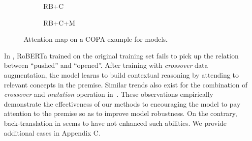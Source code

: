 \begin{figure}[th!]
\begin{subfigure}[b]{0.20\textwidth}
\caption{RB+C}
\label{fig:case_c}
\end{subfigure}
\hfill
\begin{subfigure}[b]{0.20\textwidth}
\centering
{}
\caption{RB+C+M}
\label{fig:case_cm}
\end{subfigure}
\caption{Attention map on a COPA example for models.}
\label{fig:case}
\end{figure}


In , 
RoBERTa trained on the original training set fails to pick up the 
relation between ``pushed'' and ``opened''. 
After training with \textit{crossover} data augmentation, 
the model learns to build contextual reasoning  
by attending to relevant concepts in the premise. 
Similar trends also exist for the combination of \textit{crossover} 
and \textit{mutation} operation in~. 
These observations empirically demonstrate the effectiveness of our methods 
to encouraging the model to pay attention to the premise so as to improve 
model robustness. On the contrary, back-translation in  seems 
to have not enhanced such abilities. We provide additional cases in Appendix C.

